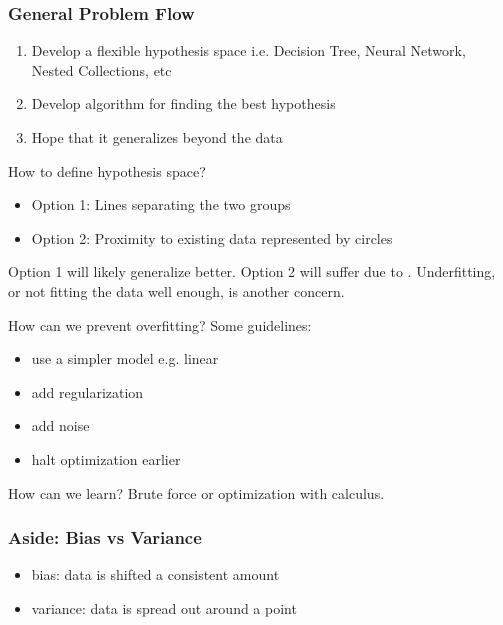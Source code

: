 \subsubsection*{General Problem Flow}
\begin{enumerate}
    \item Develop a flexible hypothesis space i.e. Decision Tree, Neural Network, Nested Collections, etc
    \item Develop algorithm for finding the best hypothesis
    \item Hope that it generalizes beyond the data
\end{enumerate}

\begin{example}
    \begin{center}
    \end{center}
    How to define hypothesis space?
    \begin{itemize}
        \item Option 1: Lines separating the two groups
        \item Option 2: Proximity to existing data represented by circles
    \end{itemize}
    Option 1 will likely generalize better. Option 2 will suffer due to . Underfitting, or not fitting the data well enough, is another concern.

    How can we prevent overfitting? Some guidelines:
    \begin{itemize}
        \item use a simpler model e.g. linear
        \item add regularization
        \item add noise
        \item halt optimization earlier
    \end{itemize}

    How can we learn? Brute force or optimization with calculus.
\end{example}

\subsubsection*{Aside: Bias vs Variance}
\begin{itemize}
    \item bias: data is shifted a consistent amount
    \item variance: data is spread out around a point
\end{itemize}